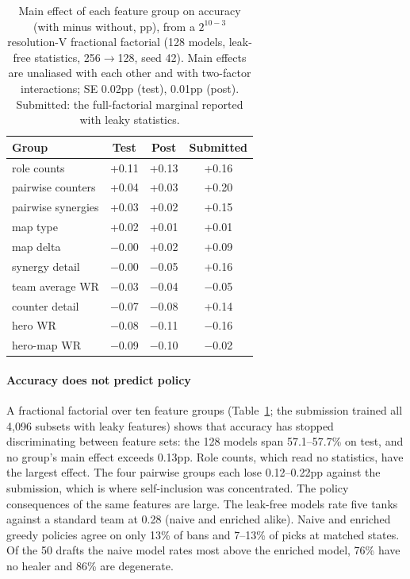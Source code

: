 \documentclass[journal]{IEEEtran}
\begin{document}
\begin{table}[t]
\centering
\caption{Main effect of each feature group on accuracy (with minus without, pp), from a $2^{10-3}$ resolution-V fractional factorial (128 models, leak-free statistics, 256$\to$128, seed 42). Main effects are unaliased with each other and with two-factor interactions; SE 0.02pp (test), 0.01pp (post). Submitted: the full-factorial marginal reported with leaky statistics.}
\label{tab:sweep}
\setlength{\tabcolsep}{4pt}
\begin{tabular}{lccc}
\toprule
Group & Test & Post & Submitted \\
\midrule
role counts & +0.11 & +0.13 & +0.16 \\
pairwise counters & +0.04 & +0.03 & +0.20 \\
pairwise synergies & +0.03 & +0.02 & +0.15 \\
map type & +0.02 & +0.01 & +0.01 \\
map delta & $-$0.00 & +0.02 & +0.09 \\
synergy detail & $-$0.00 & $-$0.05 & +0.16 \\
team average WR & $-$0.03 & $-$0.04 & $-$0.05 \\
counter detail & $-$0.07 & $-$0.08 & +0.14 \\
hero WR & $-$0.08 & $-$0.11 & $-$0.16 \\
hero-map WR & $-$0.09 & $-$0.10 & $-$0.02 \\
\bottomrule
\end{tabular}
\end{table}

\paragraph{Accuracy does not predict policy} A fractional factorial over ten feature groups (Table~\ref{tab:sweep}; the submission trained all 4,096 subsets with leaky features) shows that accuracy has stopped discriminating between feature sets: the 128 models span 57.1--57.7\% on test, and no group's main effect exceeds 0.13pp. Role counts, which read no statistics, have the largest effect. The four pairwise groups each lose 0.12--0.22pp against the submission, which is where self-inclusion was concentrated. The policy consequences of the same features are large. The leak-free models rate five tanks against a standard team at 0.28 (naive and enriched alike). Naive and enriched greedy policies agree on only 13\% of bans and 7--13\% of picks at matched states. Of the 50 drafts the naive model rates most above the enriched model, 76\% have no healer and 86\% are degenerate.
\end{document}
